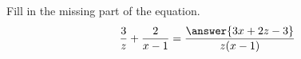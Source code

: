 \documentclass{ximera}
\author{David Kish}
\begin{document}
\begin{exercise}
Fill in the missing part of the equation.\\
\[
\frac{3}{z}+\frac{2}{x-1}=\frac{\answer{3x+2z-3}}{z(x-1)}
\]
\end{exercise}
\end{document}
